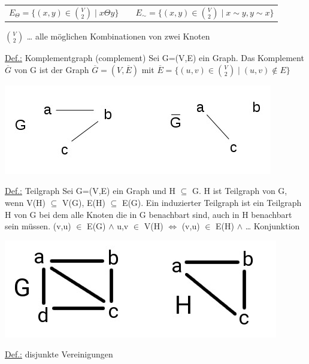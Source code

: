 \newline
\begin{tabular}{cp{1.35cm}c}
	$E_\Theta = \{(x,y) \in {V \choose 2} \mid x \Theta y\}$ & & $E_\sim = \{(x,y) \in {V \choose 2} \mid x \sim y, y \sim x\}$
\end{tabular}
\newline
${V \choose 2}$ … alle möglichen Kombinationen von zwei Knoten
\par\medskip
\underline{Def.:} Komplementgraph (complement)
\newline
Sei G=(V,E) ein Graph. Das Komplement $\overline{G}$ von G ist der Graph $\overline{G} = (V, \overline{E})$ mit $\overline{E} = \{(u,v) \in {V \choose 2} \mid (u,v) \notin E\}$
\begin{center}
\includegraphics[scale=0.5]{lectures/161202/pix/03.jpg}
\end{center}
\par\medskip
\underline{Def.:} Teilgraph
\newline
Sei G=(V,E) ein Graph und H $\subseteq$ G. H ist Teilgraph von G, wenn V(H) $\subseteq$ V(G), E(H) $\subseteq$ E(G). Ein induzierter Teilgraph ist ein Teilgraph H von G bei dem alle Knoten die in G benachbart sind, auch in H benachbart sein müssen.
\newline
(v,u) $\in$ E(G) $\land$ u,v $\in$ V(H) $\Leftrightarrow$ (v,u) $\in$ E(H)
\newline
$\land$ … Konjunktion
\begin{center}
	\includegraphics[scale=0.5]{lectures/161202/pix/04.jpg}
\end{center}
\par\medskip
\underline{Def.:} disjunkte Vereinigungen
\newline
